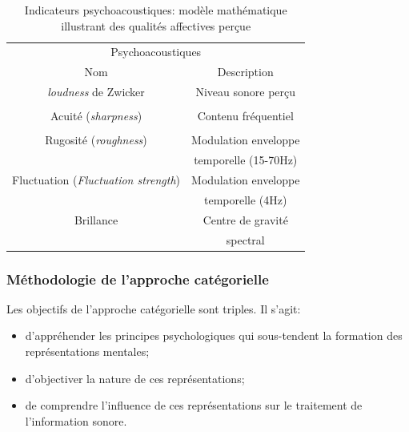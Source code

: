 \begin{table}[t]
\centering
\begin{tabular}{c c} 
\multicolumn{2}{c}{Psychoacoustiques} \\ 
Nom                           & Description            \\                      
\hline
\emph{loudness} de Zwicker                & Niveau sonore perçu     \\
                                          &         \\
Acuité (\emph{sharpness})                 & Contenu fréquentiel       \\
                                          &         \\
Rugosité (\emph{roughness})               & Modulation enveloppe        \\
                                          & temporelle (15-70Hz)       \\
Fluctuation (\emph{Fluctuation strength}) & Modulation enveloppe      \\
                                          & temporelle (4Hz)          \\
Brillance                                 & Centre de gravité       \\
                                          & spectral         \\                                       
\hline
\end{tabular}
\vspace{0.5mm}
\caption{ Indicateurs psychoacoustiques: modèle mathématique illustrant des qualités affectives perçue}
\label{tab:psychoAcousIndi}
\end{table}


\subsubsection{Méthodologie de l'approche catégorielle}
\label{sec:ch3_appCategorielle}

Les objectifs de l'approche catégorielle sont triples. Il s'agit:

\begin{itemize}
\item d'appréhender les principes psychologiques qui sous-tendent la formation des représentations mentales;
\item d'objectiver la nature de ces représentations;
\item de comprendre l'influence de ces représentations sur le traitement de l'information sonore.
\end{itemize}
 

